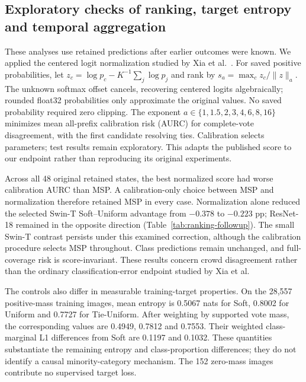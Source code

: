 \subsection{Exploratory checks of ranking, target entropy and temporal aggregation}
\label{sec:final-diagnostics}

These analyses use retained predictions after earlier outcomes were known. We applied the centered logit normalization studied by Xia et al.~\cite{xia2025smoothing}. For saved positive probabilities, let $z_c=\log p_c-K^{-1}\sum_j\log p_j$ and rank by $s_a=\max_c z_c/\lVert z\rVert_a$. The unknown softmax offset cancels, recovering centered logits algebraically; rounded float32 probabilities only approximate the original values. No saved probability required zero clipping. The exponent $a\in\{1,1.5,2,3,4,6,8,16\}$ minimizes mean all-prefix calibration risk (AURC) for complete-vote disagreement, with the first candidate resolving ties. Calibration selects parameters; test results remain exploratory. This adapts the published score to our endpoint rather than reproducing its original experiments.

Across all 48 original retained states, the best normalized score had worse calibration AURC than MSP. A calibration-only choice between MSP and normalization therefore retained MSP in every case. Normalization alone reduced the selected Swin-T Soft--Uniform advantage from $-0.378$ to $-0.223$ pp; ResNet-18 remained in the opposite direction (Table~\ref{tab:ranking-followup}). The small Swin-T contrast persists under this examined correction, although the calibration procedure selects MSP throughout. Class predictions remain unchanged, and full-coverage risk is score-invariant. These results concern crowd disagreement rather than the ordinary classification-error endpoint studied by Xia et al.

\begin{table}[!htbp]
\centering
\caption{Soft-minus-Uniform disagreement at 80\% coverage, in percentage points. Each score selects its own images. Centered normalization uses calibration-selected exponents; the calibration choice between scores equals MSP for all 48 original states. These are exploratory means over three fitted seed pairs.}
\label{tab:ranking-followup}

\end{table}

The controls also differ in measurable training-target properties. On the 28,557 positive-mass training images, mean entropy is 0.5067 nats for Soft, 0.8002 for Uniform and 0.7727 for Tie-Uniform. After weighting by supported vote mass, the corresponding values are 0.4949, 0.7812 and 0.7553. Their weighted class-marginal L1 differences from Soft are 0.1197 and 0.1032. These quantities substantiate the remaining entropy and class-proportion differences; they do not identify a causal minority-category mechanism. The 152 zero-mass images contribute no supervised target loss.

